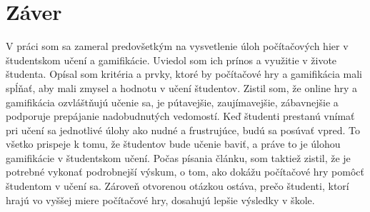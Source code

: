 \documentclass[10pt,slovak,a4paper]{article}
\begin{document}
\section{Záver} 
\label{zaver} 
V práci som sa zameral predovšetkým na vysvetlenie úloh počítačových hier v študentskom učení a gamifikácie. Uviedol som ich prínos a využitie v živote študenta. Opísal som kritéria a prvky, ktoré by počítačové hry a gamifikácia mali spĺňať, aby mali zmysel a hodnotu v učení študentov. Zistil som, že online hry a gamifikácia ozvláštňujú učenie sa, je pútavejšie, zaujímavejšie, zábavnejšie a podporuje prepájanie nadobudnutých vedomostí. Keď študenti prestanú vnímať pri učení sa jednotlivé úlohy ako nudné a frustrujúce, budú sa posúvať vpred. To všetko prispeje k tomu, že študentov bude učenie baviť, a práve to je úlohou gamifikácie v študentskom učení. 
Počas písania článku, som taktiež zistil, že je potrebné vykonať podrobnejší výskum, o tom, ako dokážu počítačové hry pomôcť študentom v učení sa. Zároveň otvorenou otázkou ostáva, prečo študenti, ktorí hrajú vo vyššej miere počítačové hry, dosahujú lepšie výsledky v škole. 






\newpage

\end{document}

